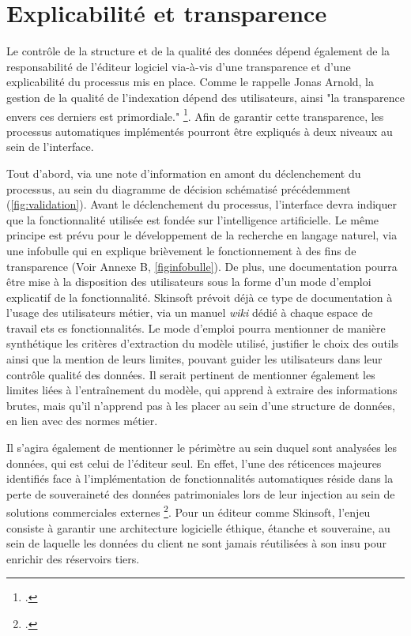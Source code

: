 \section{\label{III_1_C} Explicabilité et transparence}  

Le contrôle de la structure et de la qualité des données dépend également de la responsabilité de l'éditeur logiciel via-à-vis d'une transparence et d'une explicabilité du processus mis en place. Comme le rappelle Jonas Arnold, la gestion de la qualité de l'indexation dépend des utilisateurs, ainsi "la transparence envers ces derniers est primordiale." \footcite{zotero-item-584}. Afin de garantir cette transparence, les processus automatiques implémentés pourront être expliqués à deux niveaux au sein de l'interface. 

Tout d'abord, via une note d'information en amont du déclenchement du processus, au sein du diagramme de décision schématisé précédemment (\ref{fig:validation}). Avant le déclenchement du processus, l'interface devra indiquer que la fonctionnalité utilisée est fondée sur l'intelligence artificielle. Le même principe est prévu pour le développement de la recherche en langage naturel, via une infobulle qui en explique brièvement le fonctionnement à des fins de transparence (Voir Annexe B, \cref{figinfobulle}). De plus, une documentation pourra être mise à la disposition des utilisateurs sous la forme d'un mode d'emploi explicatif de la fonctionnalité. Skinsoft prévoit déjà ce type de documentation à l'usage des utilisateurs métier, via un manuel \textit{wiki} dédié à chaque espace de travail ets es fonctionnalités. Le mode d'emploi pourra mentionner de manière synthétique les critères d'extraction du modèle utilisé, justifier le choix des outils ainsi que la mention de leurs limites, pouvant guider les utilisateurs dans leur contrôle qualité des données. Il serait pertinent de mentionner également les limites liées à l'entraînement du modèle, qui apprend à extraire des informations brutes, mais qu'il n'apprend pas à les placer au sein d'une structure de données, en lien avec des normes métier. 

Il s'agira également de mentionner le périmètre au sein duquel sont analysées les données, qui est celui de l'éditeur seul. En effet, l'une des réticences majeures identifiés face à l'implémentation de fonctionnalités automatiques réside dans la perte de souveraineté des données patrimoniales lors de leur injection au sein de solutions commerciales externes \footcite{zotero-item-584}. Pour un éditeur comme Skinsoft, l'enjeu consiste à garantir une architecture logicielle éthique, étanche et souveraine, au sein de laquelle les données du client ne sont jamais réutilisées à son insu pour enrichir des réservoirs tiers.